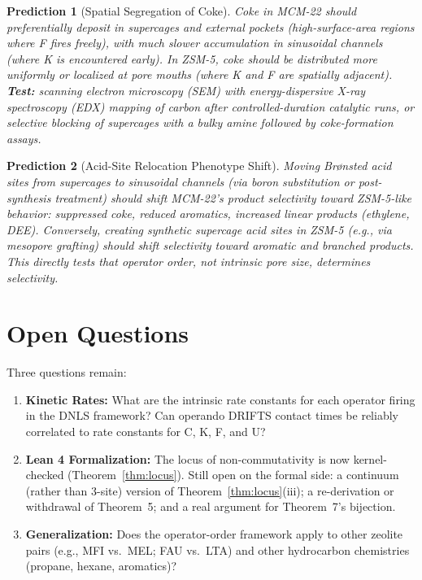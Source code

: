 \documentclass[11pt]{article}
\newtheorem{prediction}{Prediction}
\begin{document}
\begin{prediction}[Spatial Segregation of Coke]
Coke in MCM-22 should preferentially deposit in supercages and external pockets (high-surface-area regions where F fires freely), with much slower accumulation in sinusoidal channels (where K is encountered early). In ZSM-5, coke should be distributed more uniformly or localized at pore mouths (where K and F are spatially adjacent). \textbf{Test:} scanning electron microscopy (SEM) with energy-dispersive X-ray spectroscopy (EDX) mapping of carbon after controlled-duration catalytic runs, or selective blocking of supercages with a bulky amine followed by coke-formation assays.
\end{prediction}

\begin{prediction}[Acid-Site Relocation Phenotype Shift]
Moving Br\o nsted acid sites from supercages to sinusoidal channels (via boron substitution or post-synthesis treatment) should shift MCM-22's product selectivity toward ZSM-5-like behavior: suppressed coke, reduced aromatics, increased linear products (ethylene, DEE). Conversely, creating synthetic supercage acid sites in ZSM-5 (e.g., via mesopore grafting) should shift selectivity toward aromatic and branched products. This directly tests that operator order, not intrinsic pore size, determines selectivity.
\end{prediction}

\section{Open Questions}

Three questions remain:

\begin{enumerate}
\item \textbf{Kinetic Rates:} What are the intrinsic rate constants for each operator firing in the DNLS framework? Can operando DRIFTS contact times be reliably correlated to rate constants for C, K, F, and U?
\item \textbf{Lean 4 Formalization:} The locus of non-commutativity is now kernel-checked (Theorem~\ref{thm:locus}). Still open on the formal side: a continuum (rather than 3-site) version of Theorem~\ref{thm:locus}(iii); a re-derivation or withdrawal of Theorem~5; and a real argument for Theorem~7's bijection.
\item \textbf{Generalization:} Does the operator-order framework apply to other zeolite pairs (e.g., MFI vs.\ MEL; FAU vs.\ LTA) and other hydrocarbon chemistries (propane, hexane, aromatics)?
\end{enumerate}
\end{document}
